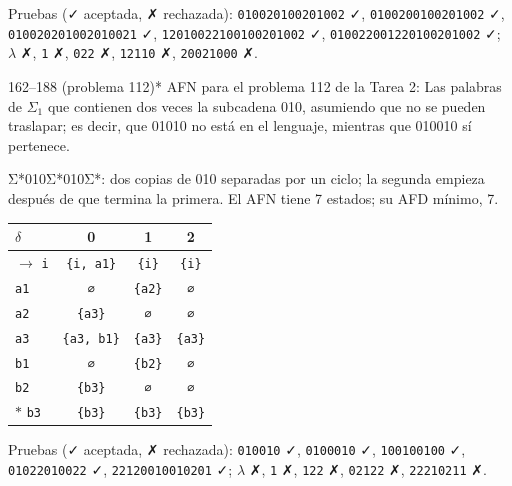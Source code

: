 \documentclass[11pt]{article}
\begin{document}
Pruebas (✓ aceptada, ✗ rechazada): \texttt{010020100201002} ✓, \texttt{0100200100201002} ✓, \texttt{010020201002010021} ✓, \texttt{12010022100100201002} ✓, \texttt{010022001220100201002} ✓; $\lambda$ ✗, \texttt{1} ✗, \texttt{022} ✗, \texttt{12110} ✗, \texttt{20021000} ✗.



\begin{ejercicio}{162--188 (problema 112)}{*}
AFN para el problema 112 de la Tarea 2: Las palabras de $\Sigma_1$ que contienen dos veces la subcadena 010, asumiendo que no se pueden traslapar; es decir, que 01010 no está en el lenguaje, mientras que 010010 sí pertenece.
\end{ejercicio}
\proc Σ*010Σ*010Σ*: dos copias de 010 separadas por un ciclo; la segunda empieza después de que termina la primera. El AFN tiene 7 estados; su AFD mínimo, 7.
\begin{center}\small\begin{tabular}{lccc}\toprule
$\delta$ & 0 & 1 & 2 \\\midrule
$\to$ \texttt{i} & \texttt{\{i, a1\}} & \texttt{\{i\}} & \texttt{\{i\}} \\
 \texttt{a1} & \texttt{∅} & \texttt{\{a2\}} & \texttt{∅} \\
 \texttt{a2} & \texttt{\{a3\}} & \texttt{∅} & \texttt{∅} \\
 \texttt{a3} & \texttt{\{a3, b1\}} & \texttt{\{a3\}} & \texttt{\{a3\}} \\
 \texttt{b1} & \texttt{∅} & \texttt{\{b2\}} & \texttt{∅} \\
 \texttt{b2} & \texttt{\{b3\}} & \texttt{∅} & \texttt{∅} \\
$*$ \texttt{b3} & \texttt{\{b3\}} & \texttt{\{b3\}} & \texttt{\{b3\}} \\
\bottomrule\end{tabular}\end{center}
Pruebas (✓ aceptada, ✗ rechazada): \texttt{010010} ✓, \texttt{0100010} ✓, \texttt{100100100} ✓, \texttt{01022010022} ✓, \texttt{22120010010201} ✓; $\lambda$ ✗, \texttt{1} ✗, \texttt{122} ✗, \texttt{02122} ✗, \texttt{22210211} ✗.
\end{document}
